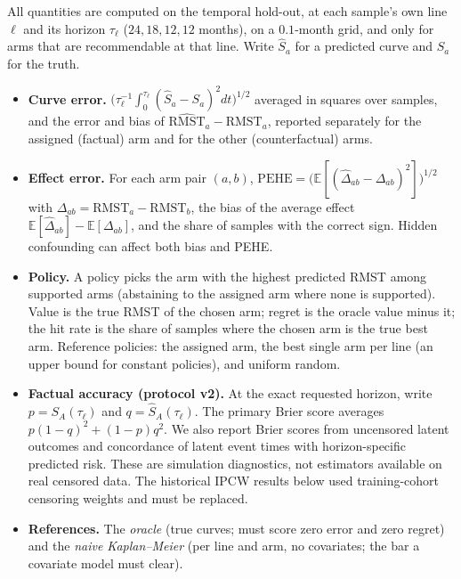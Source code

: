 All quantities are computed on the temporal hold-out, at each sample's own line $\ell$ and its
horizon $\tau_\ell$ ($24, 18, 12, 12$ months), on a $0.1$-month grid, and only for arms that
are recommendable at that line. Write $\hat S_a$ for a predicted curve and $S_a$ for the truth.
\begin{itemize}
    \item \textbf{Curve error.} $\big(\tau_\ell^{-1}\!\int_0^{\tau_\ell}(\hat S_a-S_a)^2dt\big)^{1/2}$
    averaged in squares over samples, and the error and bias of $\widehat{\text{RMST}}_a-\text{RMST}_a$,
    reported separately for the assigned (factual) arm and for the other (counterfactual) arms.
    \item \textbf{Effect error.} For each arm pair $(a,b)$,
    $\text{PEHE}=\big(\mathbb{E}[(\hat\Delta_{ab}-\Delta_{ab})^2]\big)^{1/2}$ with
    $\Delta_{ab}=\text{RMST}_a-\text{RMST}_b$, the bias of the average effect
    $\mathbb{E}[\hat\Delta_{ab}]-\mathbb{E}[\Delta_{ab}]$, and the share of samples with the
    correct sign. Hidden confounding can affect both bias and PEHE.
    \item \textbf{Policy.} A policy picks the arm with the highest predicted RMST among
    supported arms (abstaining to the assigned arm where none is supported). Value is the
    true RMST of the chosen arm; regret is the oracle value minus it; the hit rate is the share
    of samples where the chosen arm is the true best arm. Reference policies: the assigned
    arm, the best single arm per line (an upper bound for constant policies), and uniform
    random.
    \item \textbf{Factual accuracy (protocol v2).} At the exact requested horizon, write
    $p=S_A(\tau_\ell)$ and $q=\hat S_A(\tau_\ell)$. The primary Brier score averages
    $p(1-q)^2+(1-p)q^2$. We also report Brier scores from uncensored latent outcomes and
    concordance of latent event times with horizon-specific predicted risk. These are
    simulation diagnostics, not estimators available on real censored data. The historical
    IPCW results below used training-cohort censoring weights and must be replaced.
    \item \textbf{References.} The \emph{oracle} (true curves; must score zero error and zero
    regret) and the \emph{naive Kaplan--Meier} (per line and arm, no covariates; the bar a
    covariate model must clear).
\end{itemize}

